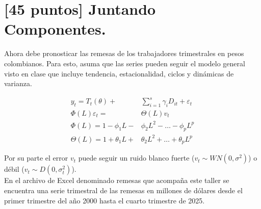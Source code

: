 \documentclass{article}
\theoremstyle{remark}
\theoremstyle{definition}
\begin{document}
\begin{enumerate}[label = \emph{\alph*})]
\begin{tcolorbox}[title=Soluci\'on 2.j]
        \end{tcolorbox}
\end{enumerate}

\section{[45 puntos] Juntando Componentes.}

{Ahora debe pronosticar las remesas de los trabajadores trimestrales en pesos colombianos. Para esto, asuma que las series pueden seguir el modelo general visto en clase que incluye tendencia, estacionalidad, ciclos y din\'amicas de varianza.}

\begin{align*}
    y_t = T_t(\theta) +& \sum_{i=1}^{s} \gamma_i D_{it} + \varepsilon_t \\
    \Phi(L) \varepsilon_t =& \Theta(L) v_t \\
    \Phi(L) = 1 - \phi_1 L -& \phi_2 L^2 - \dots - \phi_p L^p \\
    \Theta(L) = 1 + \theta_1 L +& \theta_2 L^2 + \dots + \theta_p L^p
\end{align*}

{Por su parte el error $v_t$ puede seguir un ruido blanco fuerte ($v_t\sim WN(0,
\sigma^2)$) o d\'ebil ($v_t\sim D(0,\sigma_t^2)$).} \\

{En el archivo de Excel denominado remesas que acompaña este taller se encuentra una serie trimestral de las remesas en millones de d\'olares desde el primer trimestre del año 2000 hasta el cuarto trimestre de 2025.}
\end{document}
